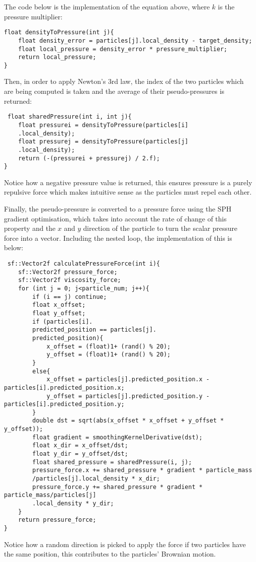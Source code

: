 \documentclass[write-up.tex]{subfiles}
\begin{document}
The code below is the implementation of the equation above, where $k$ is the pressure multiplier:
\begin{lstlisting}
float densityToPressure(int j){
    float density_error = particles[j].local_density - target_density;
    float local_pressure = density_error * pressure_multiplier;
    return local_pressure;
}
\end{lstlisting}

Then, in order to apply Newton's 3rd law, the index of the two particles which are being computed is taken and the average of their pseudo-pressures is returned:

\begin{lstlisting}
 float sharedPressure(int i, int j){
    float pressurei = densityToPressure(particles[i]
    .local_density);
    float pressurej = densityToPressure(particles[j]
    .local_density);
    return (-(pressurei + pressurej) / 2.f);
}
\end{lstlisting}
Notice how a negative pressure value is returned, this ensures pressure is a purely repulsive force which makes intuitive sense as the particles must repel each other.

Finally, the pseudo-pressure is converted to a pressure force using the SPH gradient optimisation, which takes into account the rate of change of this property and the $x$ and $y$ direction of the particle to turn the scalar pressure force into a vector. Including the nested loop, the implementation of this is below:

\begin{lstlisting}
 sf::Vector2f calculatePressureForce(int i){
    sf::Vector2f pressure_force;
    sf::Vector2f viscosity_force;
    for (int j = 0; j<particle_num; j++){
        if (i == j) continue;
        float x_offset;
        float y_offset;
        if (particles[i].
        predicted_position == particles[j].
        predicted_position){
            x_offset = (float)1+ (rand() % 20);
            y_offset = (float)1+ (rand() % 20);
        }
        else{
            x_offset = particles[j].predicted_position.x - particles[i].predicted_position.x;
            y_offset = particles[j].predicted_position.y - particles[i].predicted_position.y;
        }
        double dst = sqrt(abs(x_offset * x_offset + y_offset * y_offset));
        float gradient = smoothingKernelDerivative(dst);
        float x_dir = x_offset/dst;
        float y_dir = y_offset/dst;
        float shared_pressure = sharedPressure(i, j);
        pressure_force.x += shared_pressure * gradient * particle_mass
        /particles[j].local_density * x_dir;
        pressure_force.y += shared_pressure * gradient * particle_mass/particles[j]
        .local_density * y_dir;
    }
    return pressure_force;
}
\end{lstlisting}
Notice how a random direction is picked to apply the force if two particles have the same position, this contributes to the particles' Brownian motion.
\end{document}
